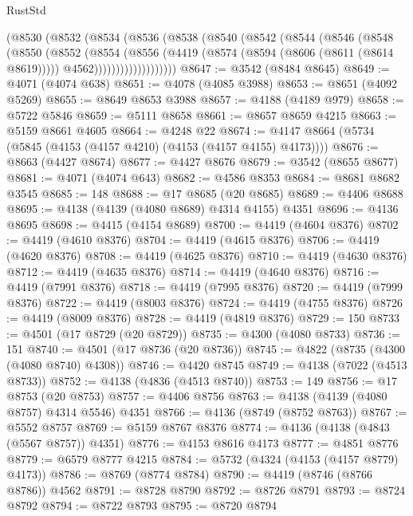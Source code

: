 \begin{lexlean}{RustStd}
\begin{coremodule}
            (@8530
              (@8532
                (@8534
                  (@8536
                    (@8538
                      (@8540
                        (@8542
                          (@8544
                            (@8546
                              (@8548
                                (@8550
                                  (@8552
                                    (@8554
                                      (@8556
                                        (@4419
                                          (@8574 (@8594 (@8606 (@8611 (@8614 @8619)))))
                                          @4562)))))))))))))))))))
@8647 := @3542 (@8484 @8645)
@8649 := @4071 (@4074 @638)
@8651 := @4078 (@4085 @3988)
@8653 := @8651 (@4092 @5269)
@8655 := @8649 @8653 @3988
@8657 := @4188 (@4189 @979)
@8658 := @5722 @5846
@8659 := @5111 @8658
@8661 := @8657 @8659 @4215
@8663 := @5159 @8661 @4605
@8664 := @4248 @22
@8674 := @4147 @8664 (@5734 (@5845 (@4153 (@4157 @4210) (@4153 (@4157 @4155) @4173))))
@8676 := @8663 (@4427 @8674)
@8677 := @4427 @8676
@8679 := @3542 (@8655 @8677)
@8681 := @4071 (@4074 @643)
@8682 := @4586 @8353
@8684 := @8681 @8682 @3545
@8685 := 148
@8688 := @17 @8685 (@20 @8685)
@8689 := @4406 @8688
@8695 := @4138 (@4139 (@4080 @8689) @4314 @4155) @4351
@8696 := @4136 @8695
@8698 := @4415 (@4154 @8689)
@8700 := @4419 (@4604 @8376)
@8702 := @4419 (@4610 @8376)
@8704 := @4419 (@4615 @8376)
@8706 := @4419 (@4620 @8376)
@8708 := @4419 (@4625 @8376)
@8710 := @4419 (@4630 @8376)
@8712 := @4419 (@4635 @8376)
@8714 := @4419 (@4640 @8376)
@8716 := @4419 (@7991 @8376)
@8718 := @4419 (@7995 @8376)
@8720 := @4419 (@7999 @8376)
@8722 := @4419 (@8003 @8376)
@8724 := @4419 (@4755 @8376)
@8726 := @4419 (@8009 @8376)
@8728 := @4419 (@4819 @8376)
@8729 := 150
@8733 := @4501 (@17 @8729 (@20 @8729))
@8735 := @4300 (@4080 @8733)
@8736 := 151
@8740 := @4501 (@17 @8736 (@20 @8736))
@8745 := @4822 (@8735 (@4300 (@4080 @8740) @4308))
@8746 := @4420 @8745
@8749 := @4138 (@7022 (@4513 @8733))
@8752 := @4138 (@4836 (@4513 @8740))
@8753 := 149
@8756 := @17 @8753 (@20 @8753)
@8757 := @4406 @8756
@8763 := @4138 (@4139 (@4080 @8757) @4314 @5546) @4351
@8766 := @4136 (@8749 (@8752 @8763))
@8767 := @5552 @8757
@8769 := @5159 @8767 @8376
@8774 := @4136 (@4138 (@4843 (@5567 @8757)) @4351)
@8776 := @4153 @8616 @4173
@8777 := @4851 @8776
@8779 := @6579 @8777 @4215
@8784 := @5732 (@4324 (@4153 (@4157 @8779) @4173))
@8786 := @8769 (@8774 @8784)
@8790 := @4419 (@8746 (@8766 @8786)) @4562
@8791 := @8728 @8790
@8792 := @8726 @8791
@8793 := @8724 @8792
@8794 := @8722 @8793
@8795 := @8720 @8794

\end{coremodule}
\end{lexlean}
